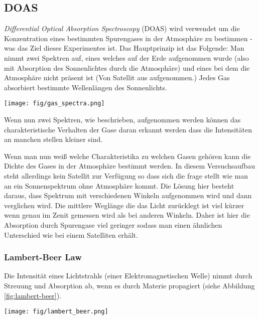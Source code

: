 \documentclass[12pt, a4paper, bibliography=totoc]{scrartcl}
\begin{document}
\begin{multicols}{2}
\subsection{DOAS}\label{ssec:DOAS}

\textit{Differential Optical Absorption Spectroscopy} (DOAS) wird verwendet um die Konzentration eines bestimmten Spurengases in der Atmosphäre zu bestimmen - was das Ziel dieses Experimentes ist.
Das Hauptprinzip ist das Folgende: 
    Man nimmt zwei Spektren auf, eines welches auf der Erde aufgenommen wurde (also mit Absorption des Sonnenlichtes durch die Atmosphäre) und eines bei dem die Atmosphäre nicht präsent ist (Von Satellit aus aufgenommen.)
Jedes Gas absorbiert bestimmte Wellenlängen des Sonnenlichts.

\begin{center}
    \texttt{[image: fig/gas\_spectra.png]}
    \label{fig:gas_spectra}
\end{center}

Wenn nun zwei Spektren, wie beschrieben, aufgenommen werden 
können das charakteristische Verhalten der Gase daran erkannt werden dass die Intensitäten an manchen stellen kleiner sind.

Wenn man nun weiß welche Charakteristika zu welchen Gasen gehören kann die Dichte des Gases in der Atmosphäre bestimmt werden.
In diesem Versuchsaufbau steht allerdings kein Satellit zur Verfügung so dass sich die frage stellt wie man an ein Sonnenspektrum ohne Atmosphäre kommt.
Die Lösung hier besteht daraus, dass Spektrum mit verschiedenen Winkeln aufgenommen wird und dann verglichen wird.
Die mittlere Weglänge die das Licht zurücklegt ist viel kürzer wenn genau im Zenit gemessen wird als bei anderen Winkeln.
Daher ist hier die Absorption durch Spurengase viel geringer sodass man einen ähnlichen Unterschied wie bei einem Satelliten erhält.

\subsubsection{Lambert-Beer Law}\label{sssec:Lamb-Beer_law}

Die Intensität eines Lichtstrahls (einer Elektromagnetischen Welle) nimmt durch Streuung und Absorption ab, wenn es durch Materie propagiert (siehe Abbildung \ref{fig:lambert-beer}).

\begin{center}
    \texttt{[image: fig/lambert\_beer.png]}
	\label{fig:lambert-beer}
\end{center}


\end{multicols}
\end{document}
